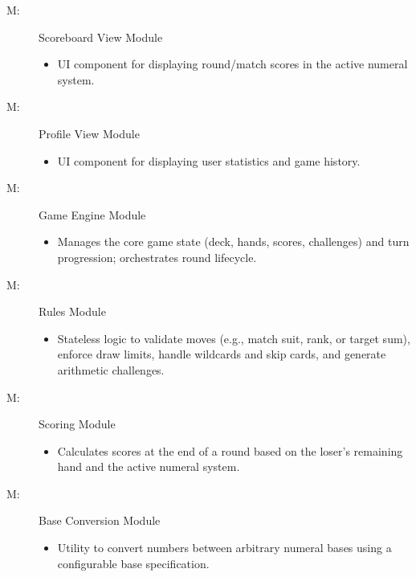\documentclass[12pt, titlepage]{article}
\newcounter{mnum}
\newcommand{\mthemnum}{M\themnum}
\begin{document}
\begin{description}
\item [ \mthemnum \label{mScoreboardView}:] Scoreboard View Module
    \begin{itemize}
        \item UI component for displaying round/match scores in the active numeral system.
    \end{itemize}

\item [ \mthemnum \label{mProfileView}:] Profile View Module
    \begin{itemize}
        \item UI component for displaying user statistics and game history.
    \end{itemize}

\item [ \mthemnum \label{mGameEngine}:] Game Engine Module
    \begin{itemize}
        \item Manages the core game state (deck, hands, scores, challenges) and turn progression; orchestrates round lifecycle.
    \end{itemize}

\item [ \mthemnum \label{mRules}:] Rules Module
    \begin{itemize}
        \item Stateless logic to validate moves (e.g., match suit, rank, or target sum), enforce draw limits, handle wildcards and skip cards, and generate arithmetic challenges.
    \end{itemize}

\item [ \mthemnum \label{mScoring}:] Scoring Module
    \begin{itemize}
        \item Calculates scores at the end of a round based on the loser's remaining hand and the active numeral system.
    \end{itemize}

\item [ \mthemnum \label{mBaseConversion}:] Base Conversion Module
    \begin{itemize}
        \item Utility to convert numbers between arbitrary numeral bases using a configurable base specification.
    \end{itemize}


\end{description}
\end{document}
